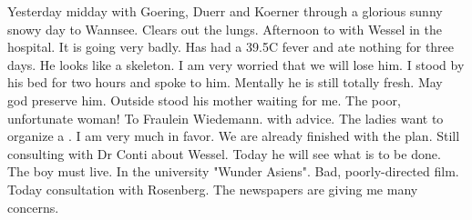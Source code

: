 Yesterday midday with Goering, Duerr and Koerner through a glorious sunny snowy day to Wannsee. Clears out the lungs. Afternoon to with Wessel in the hospital. It is going very badly. Has had a 39.5C fever and ate nothing for three days. He looks like a skeleton. I am very worried that we will lose him. I stood by his bed for two hours and spoke to him. Mentally he is still totally fresh. May god preserve him. Outside stood his mother waiting for me. The poor, unfortunate woman! To Fraulein Wiedemann.  with advice. The ladies want to organize a . I am very much in favor. We are already finished with the plan. Still consulting with Dr Conti about Wessel. Today he will see what is to be done. The boy must live. In the university "Wunder Asiens". Bad, poorly-directed film. Today consultation with Rosenberg. The newspapers are giving me many concerns.
